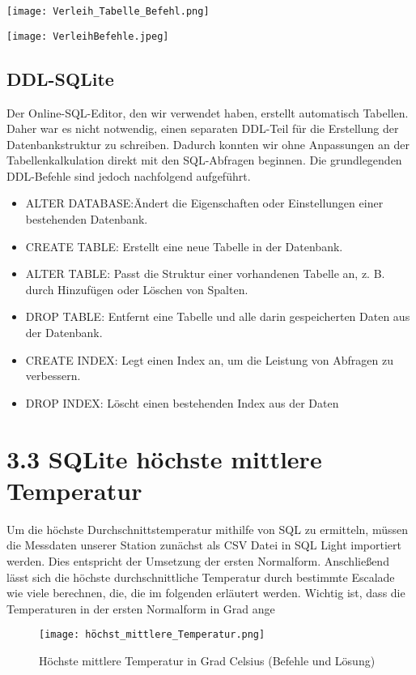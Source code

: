 \documentclass[a4paper,12pt]{article}
\begin{document}
 \begin{minipage}{0.45\textwidth}
        \centering
        \texttt{[image: Verleih\_Tabelle\_Befehl.png]}
    \end{minipage} \hspace{0.5cm}
    \begin{minipage}{0.6\textwidth}
        \centering
        \texttt{[image: VerleihBefehle.jpeg]}
    \end{minipage}


\subsection{DDL-SQLite}
Der Online-SQL-Editor, den wir verwendet haben, erstellt automatisch Tabellen. Daher war es nicht notwendig, einen separaten DDL-Teil für die Erstellung der Datenbankstruktur zu schreiben. Dadurch konnten wir ohne Anpassungen an der Tabellenkalkulation direkt mit den SQL-Abfragen beginnen. Die grundlegenden DDL-Befehle sind jedoch nachfolgend aufgeführt.
\begin{itemize}
    \item ALTER DATABASE:Ändert die Eigenschaften oder Einstellungen einer bestehenden Datenbank.
    \item CREATE TABLE: Erstellt eine neue Tabelle in der Datenbank.
    \item ALTER TABLE: Passt die Struktur einer vorhandenen Tabelle an, z. B. durch Hinzufügen oder Löschen von Spalten.

     \item DROP TABLE: Entfernt eine Tabelle und alle darin gespeicherten Daten aus der Datenbank.

     \item CREATE INDEX: Legt einen Index an, um die Leistung von Abfragen zu verbessern.

     \item DROP INDEX: Löscht einen bestehenden Index aus der Daten

\end{itemize}




\clearpage
\section{3.3 SQLite höchste mittlere Temperatur}
Um die höchste Durchschnittstemperatur mithilfe von SQL zu ermitteln, müssen die Messdaten unserer Station zunächst als CSV Datei in SQL Light importiert werden. Dies entspricht der Umsetzung der ersten Normalform. Anschließend lässt sich die höchste durchschnittliche Temperatur durch bestimmte Escalade wie viele berechnen, die, die im folgenden erläutert werden. Wichtig ist, dass die Temperaturen in der ersten Normalform in Grad ange
\begin{figure}[!htbp]
    \centering
    \texttt{[image: höchst\_mittlere\_Temperatur.png]} 
    \caption{Höchste mittlere Temperatur in Grad Celsius (Befehle und Lösung)} 
    \label{fig:bildname} 
\end{figure}
\end{document}
